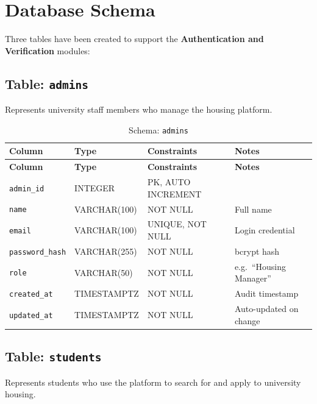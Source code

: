 \documentclass[12pt,a4paper]{article}
\begin{document}
\section{Database Schema}

Three tables have been created to support the \textbf{Authentication and Verification} modules:

\subsection{Table: \texttt{admins}}

Represents university staff members who manage the housing platform.

\begin{longtable}{@{}llll@{}}
\caption{Schema: \texttt{admins}} \\
\toprule
\textbf{Column} & \textbf{Type} & \textbf{Constraints} & \textbf{Notes} \\ \midrule
\endfirsthead
\toprule
\textbf{Column} & \textbf{Type} & \textbf{Constraints} & \textbf{Notes} \\ \midrule
\endhead
\texttt{admin\_id}      & INTEGER       & PK, AUTO INCREMENT  &                        \\
\texttt{name}            & VARCHAR(100)  & NOT NULL             & Full name              \\
\texttt{email}           & VARCHAR(100)  & UNIQUE, NOT NULL     & Login credential       \\
\texttt{password\_hash}  & VARCHAR(255)  & NOT NULL             & bcrypt hash            \\
\texttt{role}            & VARCHAR(50)   & NOT NULL             & e.g.\ ``Housing Manager'' \\
\texttt{created\_at}     & TIMESTAMPTZ   & NOT NULL             & Audit timestamp        \\
\texttt{updated\_at}     & TIMESTAMPTZ   & NOT NULL             & Auto-updated on change \\
\bottomrule
\end{longtable}

\subsection{Table: \texttt{students}}

Represents students who use the platform to search for and apply to university housing.
\end{document}
